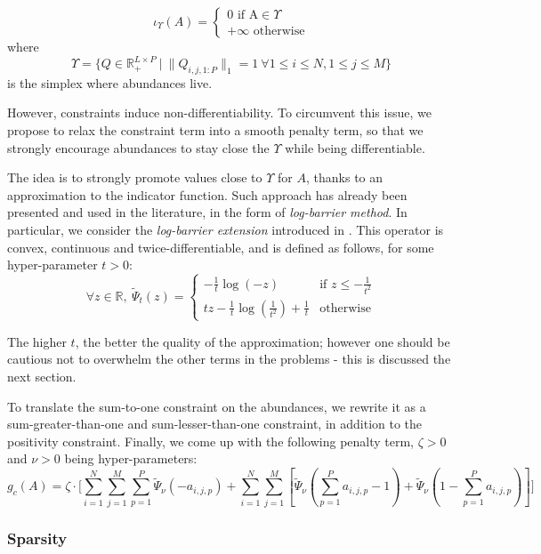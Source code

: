 \documentclass{article}
\begin{document}
$$\iota_\Upsilon (A) = \begin{cases} 0 \text{ if A}\in \Upsilon\\ +\infty \text{ otherwise} \end{cases}$$
where
$$\Upsilon = \{Q \in \mathbb{R}^{L \times P}_+\ |\ \| Q_{i, j, 1:P} \|_1 = 1 \ \forall 1 \leq i \leq N, 1 \leq j \leq M\}$$
is the simplex where abundances live.

However, constraints induce non-differentiability. To circumvent this issue, we propose to relax the constraint term into a smooth penalty term, so that we strongly encourage abundances to stay close the $\Upsilon$ while being differentiable.

The idea is to strongly promote values close to $\Upsilon$ for $A$, thanks to an approximation to the indicator function. Such approach has already been presented and used in the literature, in the form of \emph{log-barrier method}. In particular, we consider the \emph{log-barrier extension} introduced in \citet{kervadec_constrained_2020}. This operator is convex, continuous and twice-differentiable, and is defined as follows, for some hyper-parameter $t > 0$:
$$\forall z\in \mathbb{R},\ \tilde\Psi_t (z) = \begin{cases} - \frac{1}{t} \log (-z) & \text{if } z \leq -\frac{1}{t^2}\\ tz - \frac{1}{t} \log(\frac{1}{t^2}) + \frac{1}{t} & \text{otherwise} \end{cases}$$

The higher $t$, the better the quality of the approximation; however one should be cautious not to overwhelm the other terms in the problems - this is discussed the next section.

To translate the sum-to-one constraint on the abundances, we rewrite it as a sum-greater-than-one and sum-lesser-than-one constraint, in addition to the positivity constraint. Finally, we come up with the following penalty term, $\zeta > 0$ and $\nu > 0$ being hyper-parameters:
\begin{equation}\label{eq:g_c}
  g_c (A) = \zeta \cdot \Bigg[ \sum_{i = 1}^N \sum_{j = 1}^M \sum_{p=1}^P \tilde\Psi_\nu (-a_{i,j,p}) + \sum_{i = 1}^N \sum_{j = 1}^M \left[ \tilde\Psi_\nu(\sum_{p=1}^P a_{i,j,p} - 1) + \tilde\Psi_\nu(1 - \sum_{p=1}^Pa_{i,j,p}) \right] \Bigg]
\end{equation}

\subsubsection{Sparsity}
\end{document}
